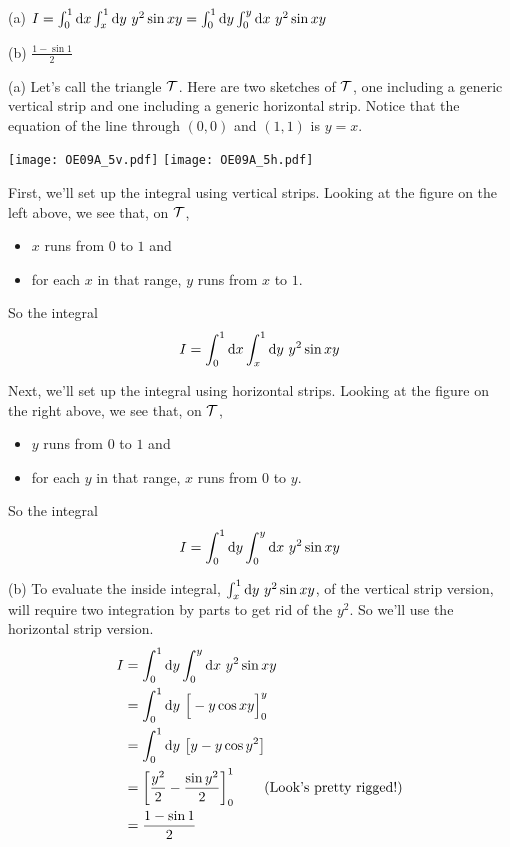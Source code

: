 %

\begin{answer}
(a) $I=\int_0^1\dee{x}\int_x^1\dee{y}\ y^2\sin xy  
           =\int_0^1\dee{y}\int_0^y\dee{x}\ y^2\sin xy$

(b) $\frac{1-\sin 1}{2}$
\end{answer}

\begin{solution}
(a) Let's call the triangle $\mathcal{T}$.
Here are two sketches of $\mathcal{T}$, one including a generic vertical strip
and one including a generic horizontal strip. Notice that the equation
of the line through $(0,0)$ and $(1,1)$ is $y=x$.

\begin{center}
     \texttt{[image: OE09A\_5v.pdf]}\qquad
     \texttt{[image: OE09A\_5h.pdf]}\qquad
\end{center}

First, we'll set up the integral using vertical strips. Looking
at the figure on the left above, we see that, on $\mathcal{T}$,
\begin{itemize}
\item
$x$ runs from $0$ to $1$ and
\item
for each $x$ in that range, $y$ runs from $x$ to $1$.
\end{itemize}
So the integral
\begin{align*}
I=\int_0^1\mathrm{d}x\int_x^1\mathrm{d}y\ y^2\sin xy
\end{align*}

Next, we'll set up the integral using horizontal strips. Looking
at the figure on the right above, we see that, on $\mathcal{T}$,
\begin{itemize}
\item
$y$ runs from $0$ to $1$ and
\item
for each $y$ in that range, $x$ runs from $0$ to $y$.
\end{itemize}
So the integral
\begin{align*}
I=\int_0^1\mathrm{d}y\int_0^y\mathrm{d}x\ y^2\sin xy
\end{align*}

(b) To evaluate the inside integral,  $\int_x^1\mathrm{d}y\ y^2\sin xy$,
of the vertical strip version, will require two integration by
parts to get rid of the $y^2$. So we'll use the horizontal strip version.
\begin{align*}
I&=\int_0^1\mathrm{d}y\int_0^y\mathrm{d}x\ y^2\sin xy \\
&=\int_0^1\mathrm{d}y\ \Big[-y\cos xy\Big]_0^y \\
&=\int_0^1\mathrm{d}y\ \big[y-y\cos y^2\big] \\
&=\left[\frac{y^2}{2}-\frac{\sin y^2}{2}\right]_0^1
\qquad\text{(Look's pretty rigged!)} \\
&= \frac{1-\sin 1}{2}
\end{align*}

\end{solution}

